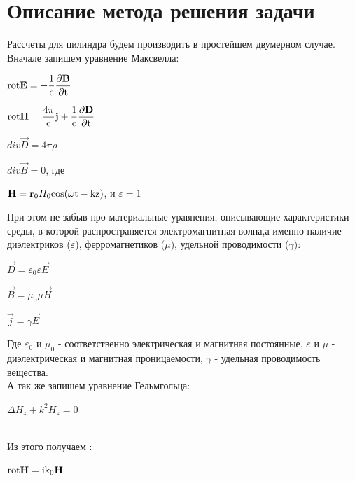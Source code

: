 \section{Описание метода решения задачи}
Рассчеты для цилиндра будем производить в простейшем двумерном случае.
\\
Вначале запишем уравнение Максвелла: \\
\begin{center}
	$ 	\rm rot\vec{E} = -\dfrac{1}{c}\dfrac{\partial \vec{B}}{\partial t} $ 
\end{center}
\begin{center}
	$ 	\rm rot\vec{H} =\dfrac{4\pi}{c}\vec{j} + \dfrac{1}{c}\dfrac{\partial \vec{D}}{\partial t} $
\end{center}
\begin{center}
	$ 	div\vec{D} = 4\pi \rho $
\end{center}
	\begin{center}
		$ div \vec{B} = 0 $, где
	\end{center} 
\begin{center}
	$ \vec{H} = \vec{r}_{0}H_{0}\rm cos(\omega t - kz) $, и $ \varepsilon = 1 $ \\
\end{center}
При этом не забыв про материальные уравнения, описывающие характеристики среды, в которой распространяется электромагнитная волна,а именно наличие диэлектриков ($ \varepsilon $), ферромагнетиков ($ \mu $), удельной проводимости ($ \gamma $):
\begin{center}
	$ \vec{D} = \varepsilon_{0} \varepsilon \vec{E} $
\end{center}
\begin{center}
	$ \vec{B} = \mu_{0} \mu \vec{H} $
\end{center}
\begin{center}
	$ \vec{j} = \gamma \vec{E} $
\end{center}
Где $ \varepsilon_{0} $ и $ \mu_{0} $ - соответственно электрическая и магнитная постоянные, $ \varepsilon $ и $ \mu $ - диэлектрическая и магнитная проницаемости, $ \gamma $ - удельная проводимость вещества. \\
А так же запишем уравнение Гельмгольца:
\begin{center}
	$ \Delta H_{z} + k^2H_{z} = 0 $ 
\end{center}\\
Из этого получаем : \begin{center}
	$ \rm rot\vec{H} = ik_{0}\vec{H} $
\end{center}
